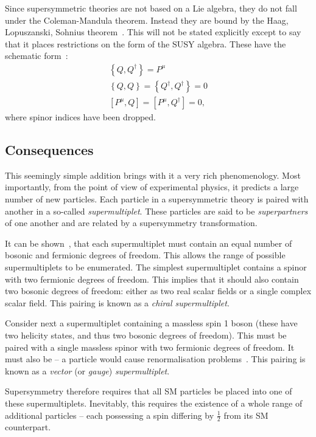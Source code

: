 Since supersymmetric theories are not based on a Lie algebra, they do not fall
under the Coleman-Mandula theorem. Instead they are bound by the Haag,
Lopuszanski, Sohnius theorem~\cite{hls_theorem}. This will not be stated explicitly except to say
that it places restrictions on the form of the \ac{SUSY} algebra. These have the
schematic form~\cite{susy_primer}:
\begin{eqnarray}
\label{eqn:susy_commutator}
\left\{Q,Q^{\dagger}\right\} = P^{\mu}\\
\left\{Q,Q\right\} = \left\{Q^{\dagger}, Q^{\dagger}\right\} = 0\\
\left[P^{\mu}, Q\right] = \left[P^{\mu}, Q^{\dagger}\right] = 0,
\end{eqnarray}
where spinor indices have been dropped.

\subsection{Consequences}
\label{sec:consequences}
This seemingly simple addition brings with it a very rich phenomenology. Most
importantly, from the point of view of experimental physics, it predicts a large
number of new particles. Each particle in a supersymmetric theory is paired with
another in a so-called \emph{supermultiplet}. These particles are said to be
\emph{superpartners} of one another and are related by a supersymmetry
transformation.

It can be shown~\cite{susy_primer}, that each supermultiplet must contain an
equal number of bosonic and fermionic degrees of freedom. This allows the range
of possible supermultiplets to be enumerated. The simplest supermultiplet
contains a spinor with two fermionic degrees of freedom. This implies that it
should also contain two bosonic degrees of freedom: either as two real scalar
fields or a single complex scalar field. This pairing is known as a \emph{chiral
  supermultiplet}.

Consider next a supermultiplet containing a massless spin 1 boson
(these have two helicity states, and thus two bosonic degrees of
freedom). This must be paired with a single massless spinor with two
fermionic degrees of freedom. It must also be \spinhalf -- a
\spinthreetwo particle would cause renormalisation problems~\cite{susy_primer}. This
pairing is known as a \emph{vector} (or \emph{gauge})
\emph{supermultiplet}.

Supersymmetry therefore requires that all \ac{SM} particles be placed into one
of these supermultiplets. Inevitably, this requires the existence of a whole
range of additional particles -- each possessing a spin differing by
$\frac{1}{2}$ from its \ac{SM} counterpart.

